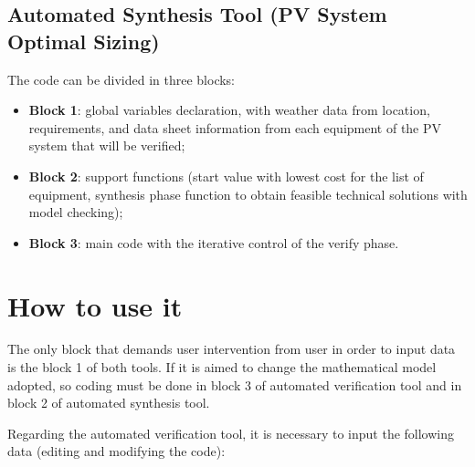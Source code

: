 \subsection{Automated Synthesis Tool (PV System Optimal Sizing)}
\label{sec:automatedsynthesis}

The code can be divided in three blocks:

\begin{itemize}
\item \textbf{Block 1}: global variables declaration, with weather data from location, requirements, and data sheet information from each equipment of the PV system that will be verified; 

\item \textbf{Block 2}: support functions (start value with lowest cost for the list of equipment, synthesis phase function to obtain feasible technical solutions with model checking);

\item \textbf{Block 3}: main code with the iterative control of the verify phase.
\end{itemize}


\section{How to use it}

The only block that demands user intervention from user in order to input data is the block 1 of both tools. If it is aimed to change the mathematical model adopted, so coding must be done in block 3 of automated verification tool and in block 2 of automated synthesis tool.

Regarding the automated verification tool, it is necessary to input the following data (editing and modifying the code):

